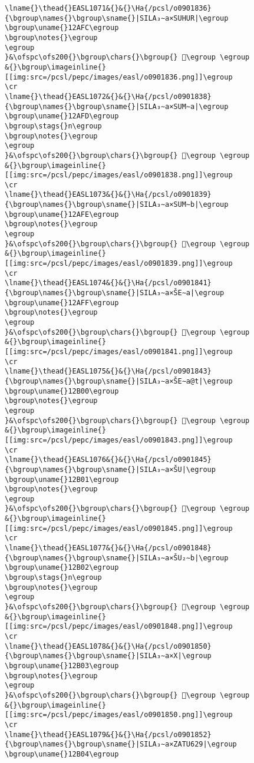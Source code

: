 \begin{verbatim}
\lname{}\thead{}EASL1071&{}&{}\Ha{/pcsl/o0901836}{\bgroup\names{}\bgroup\sname{}|SILA₃∼a×SUHUR|\egroup
\bgroup\uname{}12AFC\egroup
\bgroup\notes{}\egroup
\egroup
}&\ofspc\ofs200{}\bgroup\chars{}\bgroup{} 𒫼\egroup \egroup
&{}\bgroup\imageinline{}[[img:src=/pcsl/pepc/images/easl/o0901836.png]]\egroup
\cr
\lname{}\thead{}EASL1072&{}&{}\Ha{/pcsl/o0901838}{\bgroup\names{}\bgroup\sname{}|SILA₃∼a×SUM∼a|\egroup
\bgroup\uname{}12AFD\egroup
\bgroup\stags{}n\egroup
\bgroup\notes{}\egroup
\egroup
}&\ofspc\ofs200{}\bgroup\chars{}\bgroup{} 𒫽\egroup \egroup
&{}\bgroup\imageinline{}[[img:src=/pcsl/pepc/images/easl/o0901838.png]]\egroup
\cr
\lname{}\thead{}EASL1073&{}&{}\Ha{/pcsl/o0901839}{\bgroup\names{}\bgroup\sname{}|SILA₃∼a×SUM∼b|\egroup
\bgroup\uname{}12AFE\egroup
\bgroup\notes{}\egroup
\egroup
}&\ofspc\ofs200{}\bgroup\chars{}\bgroup{} 𒫾\egroup \egroup
&{}\bgroup\imageinline{}[[img:src=/pcsl/pepc/images/easl/o0901839.png]]\egroup
\cr
\lname{}\thead{}EASL1074&{}&{}\Ha{/pcsl/o0901841}{\bgroup\names{}\bgroup\sname{}|SILA₃∼a×ŠE∼a|\egroup
\bgroup\uname{}12AFF\egroup
\bgroup\notes{}\egroup
\egroup
}&\ofspc\ofs200{}\bgroup\chars{}\bgroup{} 𒫿\egroup \egroup
&{}\bgroup\imageinline{}[[img:src=/pcsl/pepc/images/easl/o0901841.png]]\egroup
\cr
\lname{}\thead{}EASL1075&{}&{}\Ha{/pcsl/o0901843}{\bgroup\names{}\bgroup\sname{}|SILA₃∼a×ŠE∼a@t|\egroup
\bgroup\uname{}12B00\egroup
\bgroup\notes{}\egroup
\egroup
}&\ofspc\ofs200{}\bgroup\chars{}\bgroup{} 𒬀\egroup \egroup
&{}\bgroup\imageinline{}[[img:src=/pcsl/pepc/images/easl/o0901843.png]]\egroup
\cr
\lname{}\thead{}EASL1076&{}&{}\Ha{/pcsl/o0901845}{\bgroup\names{}\bgroup\sname{}|SILA₃∼a×ŠU|\egroup
\bgroup\uname{}12B01\egroup
\bgroup\notes{}\egroup
\egroup
}&\ofspc\ofs200{}\bgroup\chars{}\bgroup{} 𒬁\egroup \egroup
&{}\bgroup\imageinline{}[[img:src=/pcsl/pepc/images/easl/o0901845.png]]\egroup
\cr
\lname{}\thead{}EASL1077&{}&{}\Ha{/pcsl/o0901848}{\bgroup\names{}\bgroup\sname{}|SILA₃∼a×ŠU₂∼b|\egroup
\bgroup\uname{}12B02\egroup
\bgroup\stags{}n\egroup
\bgroup\notes{}\egroup
\egroup
}&\ofspc\ofs200{}\bgroup\chars{}\bgroup{} 𒬂\egroup \egroup
&{}\bgroup\imageinline{}[[img:src=/pcsl/pepc/images/easl/o0901848.png]]\egroup
\cr
\lname{}\thead{}EASL1078&{}&{}\Ha{/pcsl/o0901850}{\bgroup\names{}\bgroup\sname{}|SILA₃∼a×X|\egroup
\bgroup\uname{}12B03\egroup
\bgroup\notes{}\egroup
\egroup
}&\ofspc\ofs200{}\bgroup\chars{}\bgroup{} 𒬃\egroup \egroup
&{}\bgroup\imageinline{}[[img:src=/pcsl/pepc/images/easl/o0901850.png]]\egroup
\cr
\lname{}\thead{}EASL1079&{}&{}\Ha{/pcsl/o0901852}{\bgroup\names{}\bgroup\sname{}|SILA₃∼a×ZATU629|\egroup
\bgroup\uname{}12B04\egroup

\end{verbatim}

